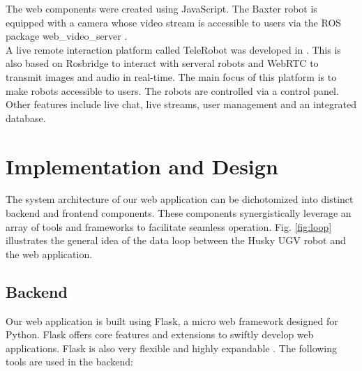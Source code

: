 \documentclass[conference]{IEEEtran}
\begin{document}
The web components were created using JavaScript. The Baxter robot is equipped with a camera whose video stream is accessible to users via the ROS package web\_video\_server \cite{webvideoserver}.\\
A live remote interaction platform called TeleRobot was developed in \cite{wang}. This is also based on Rosbridge to interact with serveral robots and WebRTC to transmit images and audio in real-time. The main focus of this platform is to make robots accessible to users. The robots are controlled via a control panel. Other features include live chat, live streams, user management and an integrated database.

\section{Implementation and Design}
The system architecture of our web application can be dichotomized into distinct backend and frontend components. These components synergistically leverage an array of tools and frameworks to facilitate seamless operation.
Fig. \ref{fig:loop} illustrates the general idea of the data loop between the Husky UGV robot and the web application.

\subsection{Backend}
Our web application is built using Flask, a micro web framework designed for Python.
Flask offers core features and extensions to swiftly develop web applications. Flask is also very flexible and highly expandable \cite{flasksqlite}. The following tools are used in the backend:
\end{document}
